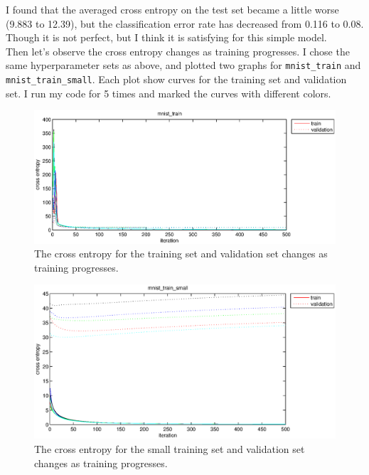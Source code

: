 \documentclass{article}
\begin{document}
I found that the averaged cross entropy on the test set became a little worse (9.883 to 12.39), but the classification error rate has decreased from 0.116 to 0.08. Though it is not perfect, but I think it is satisfying for this simple model.\\

Then let's observe the cross entropy changes as training progresses. I chose the same hyperparameter sets as above, and plotted two graphs for \texttt{mnist\_train} and \texttt{mnist\_train\_small}. Each plot show curves for the training set and validation set. I run my code for 5 times and marked the curves with different colors.\\

\begin{figure}[htb]
\centering
\includegraphics[width=\textwidth]{train_.eps}
\caption{The cross entropy for the training set and validation set changes as training progresses.
\label{fig:train}}
\end{figure}

\begin{figure}[htb]
\centering
\includegraphics[width=\textwidth]{train_small.eps}
\caption{The cross entropy for the small training set and validation set changes as training progresses.
\label{fig:train-s}}
\end{figure}
\end{document}
